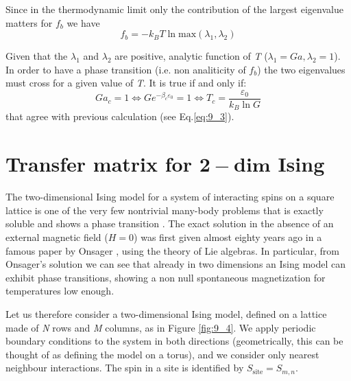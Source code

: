 \documentclass[../main/main.tex]{subfiles}
\begin{document}
Since in the thermodynamic limit only the contribution of the largest eigenvalue matters for \( f_b \) we have
\begin{equation*}
  f_b = - k_B T \ln{\text{max} (\lambda _1, \lambda _2)}
\end{equation*}
\begin{remark}
Given that the \( \lambda _1 \) and \( \lambda _2 \) are positive, analytic function of \emph{T} (\( \lambda _1 = Ga, \lambda _2=1 \)). In order to have a phase transition
(i.e. non analiticity of \( f_b \)) the two eigenvalues must cross for a given value of \emph{T}. It is true if and only if:
\begin{equation}
  G a_c =1 \Leftrightarrow G e^{-\beta _c \varepsilon _0} = 1  \Leftrightarrow T_c = \frac{\varepsilon _0}{k_B \ln{G} }
\end{equation}
that agree with previous calculation (see Eq.\eqref{eq:9_3}).
\end{remark}


\section{Transfer matrix for \(\pmb{2-dim}\) Ising}
The two-dimensional Ising model for a system of interacting spins on a square lattice is one of the very few nontrivial many-body problems that is exactly soluble and shows a phase transition \cite{9_lesson_2}. 
The exact solution in the absence of an external magnetic field (\(H=0\)) was first given almost eighty years ago in a famous paper by Onsager \cite{9_lesson_1}, using the theory of Lie algebras. In particular, from Onsager's solution we can see that already in two dimensions an Ising model can exhibit phase transitions, showing a non null spontaneous magnetization for temperatures low enough.


Let us therefore consider a two-dimensional Ising model, defined on a lattice made of \emph{N} rows and \emph{M} columns, as in Figure \ref{fig:9_4}. We apply periodic boundary conditions to the system in both directions (geometrically, this can be thought of as defining the model on a torus), and we  consider only nearest neighbour interactions.
The spin in a site is identified by \( S_{\text{site}} = S_{m,n} \).
\end{document}
